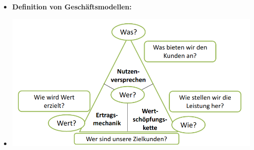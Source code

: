\documentclass[12pt,a4paper]{article}
\begin{document}
\begin{itemize}
   \item \textbf{Definition von Geschäftsmodellen:}
   \item[] \includegraphics[scale=0.4]{wfragen.png}
   

\end{itemize}
\end{document}
